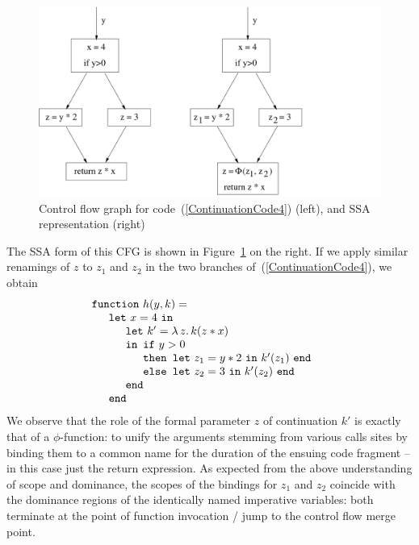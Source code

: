 \begin{figure}
\begin{center}
\includegraphics[scale=0.5]{FunctionalCode1CFG}
\end{center}
\caption{\label{FigureCFGForSharedContinuation} Control flow graph for code~(\ref{ContinuationCode4}) (left), and SSA representation (right)}
\end{figure}

The SSA form of this CFG is shown in
Figure~\ref{FigureCFGForSharedContinuation} on the right. If we apply
similar renamings of $z$ to $z_1$ and $z_2$ in the two branches
of~(\ref{ContinuationCode4}), we obtain
\begin{equation}
\label{ContinuationCode5}
\begin{array}{l}
\texttt{function}\ h (y, k) =\\
\quad
  \begin{array}{l}
    \texttt{let}\ x=4\ \texttt{in} \\
    \quad \begin{array}{l}
            \texttt{let}\ k' = \lambda\, z .\, k (z*x)\\
            \texttt{in}
               \begin{array}[t]{l}
                 \texttt{if}\ y>0\\
                 \texttt{then\ let}\ z_1 = y*2\ \texttt{in}\ k'(z_1)\ \texttt{end}\\
                 \texttt{else\ let}\ z_2 = 3\ \texttt{in}\ k'(z_2)\ \texttt{end}
               \end{array}\\
            \texttt{end}
          \end{array} \\
    \texttt{end}
  \end{array}
\end{array}
\end{equation}
We observe that the role of the formal parameter $z$ of continuation
$k'$ is exactly that of a $\phi$-function: to unify the arguments
stemming from various calls sites by binding them to a common name for
the duration of the ensuing code fragment -- in this case just the
return expression. As expected from the above understanding of scope
and dominance, the scopes of the bindings for $z_1$ and $z_2$ coincide
with the dominance regions of the identically named imperative
variables: both terminate at the point of function invocation / jump
to the control flow merge point.


